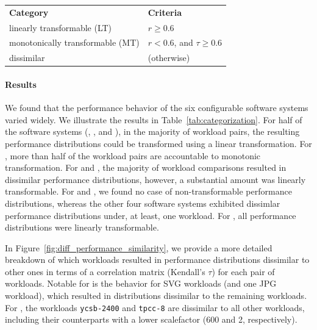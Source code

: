 \begin{tabular}{p{4.4cm}l}
	 \textbf{Category} & \textbf{Criteria} \\
	{linearly transformable (LT)} & $r \geq 0.6$ \\
	{monotonically transformable (MT)} & $r < 0.6$, and $\tau \geq 0.6$ \\
	{dissimilar}  & (otherwise) \\%
\end{tabular}

\paragraph*{Results}
We found that the performance behavior of the six configurable software systems varied widely. We illustrate the results in Table~\ref{tab:categorization}. For half of the software systems (\kanzi, \batik, and \jadx), in the majority of workload pairs, the resulting performance distributions could be transformed using a linear transformation. For \jumper, more than half of the workload pairs are accountable to monotonic transformation. For \dconvert and \htwo, the majority of workload comparisons resulted in dissimilar performance distributions, however, a substantial amount was linearly transformable. For \jumper and \jadx, we found no case of non-transformable performance distributions, whereas the other four software systems exhibited dissimlar performance distributions under, at least, one workload. For \jadx, all performance distributions were linearly transformable.

In Figure~\ref{fig:diff_performance_similarity}, we provide a more detailed breakdown of which workloads resulted in performance distributions dissimilar to other ones in terms of a correlation matrix (Kendall's $\tau$) for each pair of workloads. Notable for \dconvert is the behavior for SVG workloads (and one JPG workload), which resulted in distributions dissimilar to the remaining workloads. For \htwo, the workloads \texttt{ycsb-2400} and \texttt{tpcc-8} are dissimilar to all other workloads, including their counterparts with a lower scalefactor (600 and 2, respectively).

